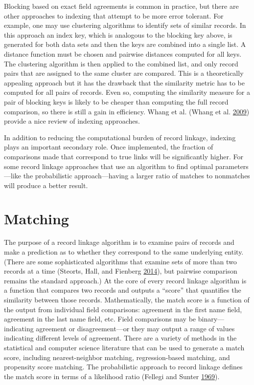 \documentclass[]{krantz}
\begin{document}
Blocking based on exact field agreements is common in practice, but
there are other approaches to indexing that attempt to be more error
tolerant. For example, one may use clustering algorithms to identify
sets of similar records. In this approach an index key, which is
analogous to the blocking key above, is generated for both data sets and
then the keys are combined into a single list. A distance function must
be chosen and pairwise distances computed for all keys. The clustering
algorithm is then applied to the combined list, and only record pairs
that are assigned to the same cluster are compared. This is a
theoretically appealing approach but it has the drawback that the
similarity metric has to be computed for all pairs of records. Even so,
computing the similarity measure for a pair of blocking keys is likely
to be cheaper than computing the full record comparison, so there is
still a gain in efficiency. Whang et al. (Whang et al.
\protect\hyperlink{ref-whang2009entity}{2009}) provide a nice review of
indexing approaches.

In addition to reducing the computational burden of record linkage,
indexing plays an important secondary role. Once implemented, the
fraction of comparisons made that correspond to true links will be
significantly higher. For some record linkage approaches that use an
algorithm to find optimal parameters---like the probabilistic
approach---having a larger ratio of matches to nonmatches will produce a
better result.

\section{Matching}\label{matching}

The purpose of a record linkage algorithm is to examine pairs of records
and make a prediction as to whether they correspond to the same
underlying entity. (There are some sophisticated algorithms that examine
sets of more than two records at a time (Steorts, Hall, and Fienberg
\protect\hyperlink{ref-steorts2014smered}{2014}), but pairwise
comparison remains the standard approach.) At the core of every record
linkage algorithm is a function that compares two records and outputs a
``score'' that quantifies the similarity between those records.
Mathematically, the match score is a function of the output from
individual field comparisons: agreement in the first name field,
agreement in the last name field, etc. Field comparisons may be
binary---indicating agreement or disagreement---or they may output a
range of values indicating different levels of agreement. There are a
variety of methods in the statistical and computer science literature
that can be used to generate a match score, including nearest-neighbor
matching, regression-based matching, and propensity score matching. The
probabilistic approach to record linkage defines the match score in
terms of a likelihood ratio (Fellegi and Sunter
\protect\hyperlink{ref-FS69}{1969}).
\end{document}
